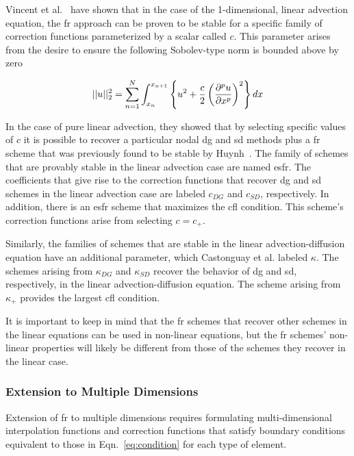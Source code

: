 Vincent et al.~\cite{vincent2011new} have shown that in the case of the 1-dimensional, linear advection equation, the \gls{fr} approach can be proven to be stable for a specific family of correction functions parameterized by a scalar called $c$. This parameter arises from the desire to ensure the following Sobolev-type norm is bounded above by zero

\begin{equation}
||u||^2_2=\sum_{n=1}^{N}\int_{x_n}^{x_{n+1}} \left\{ u^2 + 
\frac{c}{2} \left( {\frac{\partial ^p u}{\partial x^p}} \right)^2 \right\} dx
\end{equation}

In the case of pure linear advection, they showed that by selecting specific values of $c$ it is possible to recover a particular nodal \gls{dg} and \gls{sd} methods plus a \gls{fr} scheme that was previously found to be stable by Huynh~\cite{huynh2007flux}. The family of schemes that are provably stable in the linear advection case are named \gls{esfr}. The coefficients that give rise to the correction functions that recover \gls{dg} and \gls{sd} schemes in the linear advection case are labeled $c_{DG}$ and $c_{SD}$, respectively. In addition, there is an \gls{esfr} scheme that maximizes the \gls{cfl} condition. This scheme's correction functions arise from selecting $c = c_{+}$.

Similarly, the families of schemes that are stable in the linear advection-diffusion equation have an additional parameter, which Castonguay et al. \cite{castonguay2013energy} labeled $\kappa$. The schemes arising from $\kappa_{DG}$ and $\kappa_{SD}$ recover the behavior of \gls{dg} and \gls{sd}, respectively, in the linear advection-diffusion equation. The scheme arising from $\kappa_{+}$ provides the largest \gls{cfl} condition.

It is important to keep in mind that the \gls{fr} schemes that recover other schemes in the linear equations can be used in non-linear equations, but the \gls{fr} schemes' non-linear properties will likely be different from those of the schemes they recover in the linear case. 
\subsubsection{Extension to Multiple Dimensions}

Extension of \gls{fr} to multiple dimensions requires formulating multi-dimensional interpolation functions and correction functions that satisfy boundary conditions equivalent to those in Eqn.~\eqref{eq:condition} for each type of element.

